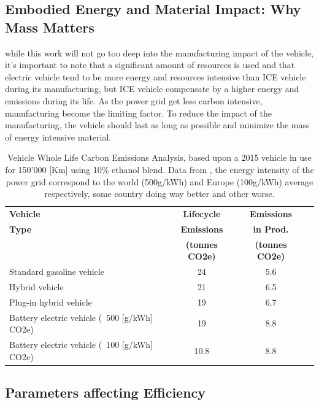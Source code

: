 \subsection{Embodied Energy and Material Impact: Why Mass Matters }

while this work will not go too deep into the manufacturing impact of the vehicle, it's important to note that a significant amount of resources is used and that electric vehicle tend to be more energy and resources intensive than ICE vehicle during its manufacturing, but ICE vehicle compensate by a higher energy and emissions during its life. As the power grid get less carbon intensive, manufacturing become the limiting factor. To reduce the impact of the manufacturing, the vehicle should last as long as possible and minimize the mass of energy intensive material.

\begin{table}[h]
    \centering
    \begin{tabular}{lccc}
        \toprule
        \textbf{Vehicle} & \textbf{Lifecycle} & \textbf{Emissions} \\
        \textbf{Type} & \textbf{Emissions} & \textbf{in Prod.} \\
        & \textbf{(tonnes CO2e)} & \textbf{(tonnes CO2e)} \\
        \midrule
        Standard gasoline vehicle & 24  & 5.6 \\
        Hybrid vehicle            & 21  & 6.5 \\
        Plug-in hybrid vehicle    & 19  & 6.7 \\
        Battery electric vehicle (~500 [g/kWh] CO2e)  & 19  & 8.8 \\
        Battery electric vehicle (~100 [g/kWh] CO2e)  & 10.8 & 8.8 \\
        \bottomrule
    \end{tabular}
    \caption{Vehicle Whole Life Carbon Emissions Analysis, based upon a 2015 vehicle in use for 150'000 [Km] using 10\% ethanol blend. Data from \cite{noauthor_zemo2025lifecycle_nodate}, the energy intensity of the power grid correspond to the world (500g/kWh) and Europe (100g/kWh) average respectively, some country doing way better and other worse.\cite{noauthor_power_nodate}}
    \label{tab:carbon_emissions}
\end{table}

\newpage

\subsection{Parameters affecting Efficiency}

